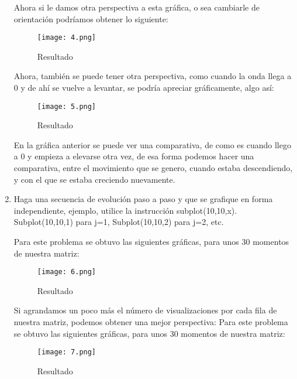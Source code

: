 \documentclass{article}
\begin{document}
\begin{flushleft}
\begin{enumerate}
Ahora si le damos otra perspectiva a esta gráfica, o sea cambiarle de orientación podríamos obtener lo siguiente:
\begin{figure}[H]
        \centering
         \texttt{[image: 4.png]}
        \caption{Resultado}
\end{figure} 

Ahora, también se puede tener otra perspectiva, como cuando la onda llega a 0 y de ahí se vuelve a levantar, se podría apreciar gráficamente, algo así:

\begin{figure}[H]
        \centering
         \texttt{[image: 5.png]}
        \caption{Resultado}
\end{figure} 

En la gráfica anterior se puede ver una comparativa, de como es cuando llego a 0 y empieza a elevarse otra vez, de esa forma podemos hacer una comparativa, entre el movimiento que se genero, cuando estaba descendiendo, y con el que se estaba creciendo nuevamente.

\vspace{0.4 cm}
\item Haga una secuencia de evolución paso a paso y que se grafique en forma independiente, ejemplo,
utilice la instrucción subplot(10,10,x). Subplot(10,10,1) para j=1, Subplot(10,10,2) para j=2,
etc.
 
 \vspace{0.2 cm}
 Para este problema se obtuvo las siguientes gráficas, para unos 30 momentos de nuestra matriz:
 \begin{figure}[H]
        \centering
         \texttt{[image: 6.png]}
        \caption{Resultado}
\end{figure} 

Si agrandamos un poco más el número de visualizaciones por cada fila de nuestra matriz, podemos obtener una mejor perspectiva:
Para este problema se obtuvo las siguientes gráficas, para unos 30 momentos de nuestra matriz:
 \begin{figure}[H]
        \centering
         \texttt{[image: 7.png]}
        \caption{Resultado}
\end{figure} 
 
 
\end{enumerate}

 



\end{flushleft}
\end{document}
